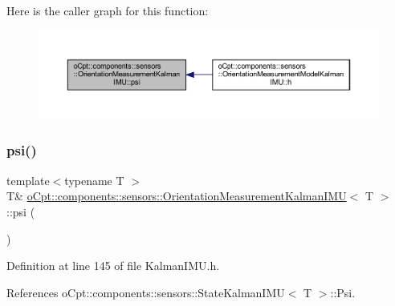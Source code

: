 Here is the caller graph for this function\+:
\nopagebreak
\begin{figure}[H]
\begin{center}
\leavevmode
\includegraphics[width=350pt]{classo_cpt_1_1components_1_1sensors_1_1_orientation_measurement_kalman_i_m_u_a3f9154bd8fe98787504823afd14ec2f0_icgraph}
\end{center}
\end{figure}
\hypertarget{classo_cpt_1_1components_1_1sensors_1_1_orientation_measurement_kalman_i_m_u_af754dc9b838d65a699f9161c34715aad}{}\label{classo_cpt_1_1components_1_1sensors_1_1_orientation_measurement_kalman_i_m_u_af754dc9b838d65a699f9161c34715aad} 
\subsubsection{\texorpdfstring{psi()}{psi()}\hspace{0.1cm}{\footnotesize\ttfamily [2/2]}}
{\footnotesize\ttfamily template$<$typename T $>$ \\
T\& \hyperlink{classo_cpt_1_1components_1_1sensors_1_1_orientation_measurement_kalman_i_m_u}{o\+Cpt\+::components\+::sensors\+::\+Orientation\+Measurement\+Kalman\+I\+MU}$<$ T $>$\+::psi (\begin{DoxyParamCaption}{ }\end{DoxyParamCaption})\hspace{0.3cm}{\ttfamily [inline]}}



Definition at line 145 of file Kalman\+I\+M\+U.\+h.



References o\+Cpt\+::components\+::sensors\+::\+State\+Kalman\+I\+M\+U$<$ T $>$\+::\+Psi.

\hypertarget{classo_cpt_1_1components_1_1sensors_1_1_orientation_measurement_kalman_i_m_u_aad73d00dc09c0f0da00f28b9ac703c52}{}\label{classo_cpt_1_1components_1_1sensors_1_1_orientation_measurement_kalman_i_m_u_aad73d00dc09c0f0da00f28b9ac703c52} 
